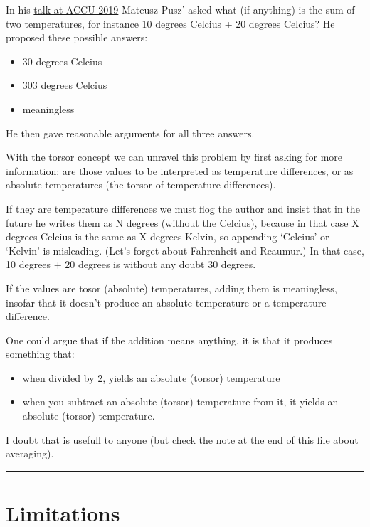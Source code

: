 \documentclass[]{article}
\begin{document}
In his \href{https://www.youtube.com/watch?v=nN5ya6oNImg}{talk at ACCU
2019} Mateusz Pusz' asked what (if anything) is the sum of two
temperatures, for instance 10 degrees Celcius + 20 degrees Celcius? He
proposed these possible answers:

\begin{itemize}
\item
  30 degrees Celcius
\item
  303 degrees Celcius
\item
  meaningless
\end{itemize}

He then gave reasonable arguments for all three answers.

With the torsor concept we can unravel this problem by first asking for
more information: are those values to be interpreted as temperature
differences, or as absolute temperatures (the torsor of temperature
differences).

If they are temperature differences we must flog the author and insist
that in the future he writes them as N degrees (without the Celcius),
because in that case X degrees Celcius is the same as X degrees Kelvin,
so appending `Celcius' or `Kelvin' is misleading. (Let's forget about
Fahrenheit and Reaumur.) In that case, 10 degrees + 20 degrees is
without any doubt 30 degrees.

If the values are tosor (absolute) temperatures, adding them is
meaningless, insofar that it doesn't produce an absolute temperature or
a temperature difference.

One could argue that if the addition means anything, it is that it
produces something that:

\begin{itemize}
\item
  when divided by 2, yields an absolute (torsor) temperature
\item
  when you subtract an absolute (torsor) temperature from it, it yields
  an absolute (torsor) temperature.
\end{itemize}

I doubt that is usefull to anyone (but check the note at the end of this
file about averaging).

\begin{center}\rule{0.5\linewidth}{\linethickness}\end{center}

\hypertarget{limitations}{%
\section{Limitations}\label{limitations}}
\end{document}
